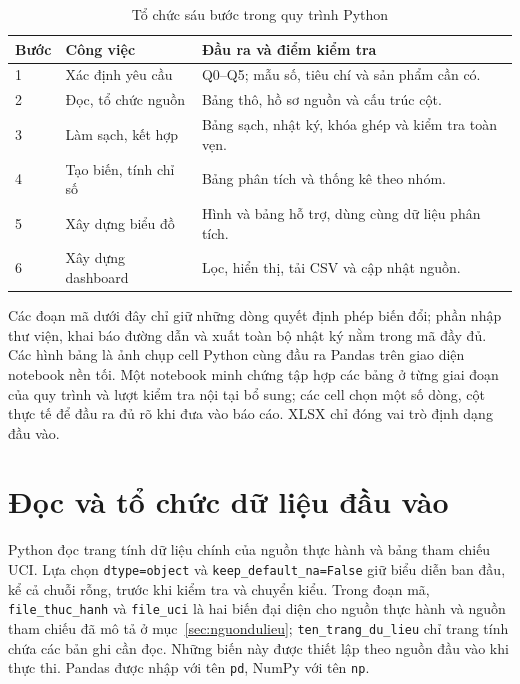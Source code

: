 \documentclass[12pt,a4paper,oneside]{report}
\newcommand{\maCot}[1]{{\urlstyle{tt}\def\UrlBreaks{\do\_\do\/\do\.}\def\UrlBigBreaks{}\nolinkurl{#1}}}
\begin{document}
\begin{table}[htbp]
  \centering
  \caption{Tổ chức sáu bước trong quy trình Python}
  \label{tab:quytrinhpython}
  \begingroup
  \small
  \begin{tabularx}{\linewidth}{@{}p{0.95cm}p{3.85cm}Y@{}}
    \toprule
    Bước & Công việc & Đầu ra và điểm kiểm tra \\
     & Xác định yêu cầu & Q0--Q5; mẫu số, tiêu chí và sản phẩm cần có. \\
    2 & Đọc, tổ chức nguồn & Bảng thô, hồ sơ nguồn và cấu trúc cột. \\
    3 & Làm sạch, kết hợp & Bảng sạch, nhật ký, khóa ghép và kiểm tra toàn vẹn. \\
    4 & Tạo biến, tính chỉ số & Bảng phân tích và thống kê theo nhóm. \\
    5 & Xây dựng biểu đồ & Hình và bảng hỗ trợ, dùng cùng dữ liệu phân tích. \\
    6 & Xây dựng dashboard & Lọc, hiển thị, tải CSV và cập nhật nguồn. \\
    \bottomrule
  \end{tabularx}
  \endgroup
\end{table}

Các đoạn mã dưới đây chỉ giữ những dòng quyết định phép biến đổi; phần nhập thư viện, khai báo đường dẫn và xuất toàn bộ nhật ký nằm trong mã đầy đủ. Các hình bảng là ảnh chụp cell Python cùng đầu ra Pandas trên giao diện notebook nền tối. Một notebook minh chứng tập hợp các bảng ở từng giai đoạn của quy trình và lượt kiểm tra nội tại bổ sung; các cell chọn một số dòng, cột thực tế để đầu ra đủ rõ khi đưa vào báo cáo. XLSX chỉ đóng vai trò định dạng đầu vào.

\section{Đọc và tổ chức dữ liệu đầu vào}
\label{sec:ch3docdulieu}

Python đọc trang tính dữ liệu chính của nguồn thực hành và bảng tham chiếu UCI. Lựa chọn \maCot{dtype=object} và \maCot{keep_default_na=False} giữ biểu diễn ban đầu, kể cả chuỗi rỗng, trước khi kiểm tra và chuyển kiểu. Trong đoạn mã, \maCot{file_thuc_hanh} và \maCot{file_uci} là hai biến đại diện cho nguồn thực hành và nguồn tham chiếu đã mô tả ở mục~\ref{sec:nguondulieu}; \maCot{ten_trang_du_lieu} chỉ trang tính chứa các bản ghi cần đọc. Những biến này được thiết lập theo nguồn đầu vào khi thực thi. Pandas được nhập với tên \maCot{pd}, NumPy với tên \maCot{np}.
\end{document}
